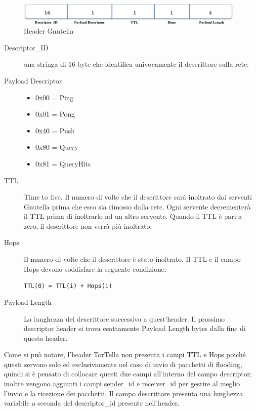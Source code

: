 \begin{figure}[H]
\begin{center}
\includegraphics[scale=0.38]{etc/gnutellaheader.jpg}
\caption{Header Gnutella}
\label{gnutellaheader}
\end{center}
\end{figure}
\begin{description}
\item[Descriptor\_ID] una stringa di 16 byte che identifica univocamente il descrittore sulla rete;
\item[Payload Descriptor]
\begin{itemize}
	\item 0x00 = Ping
	\item 0x01 = Pong
	\item 0x40 = Push
	\item 0x80 = Query
	\item 0x81 = QueryHits	
\end{itemize}
\item[TTL] Time to live. Il numero di volte che il descrittore sarà inoltrato dai serventi Gnutella prima che esso sia rimosso dalla rete. Ogni servente decrementerà il TTL prima di inoltrarlo ad un altro servente. Quando il TTL è pari a zero, il descrittore non verrà più inoltrato;
\item[Hops] Il numero di volte che il descrittore è stato inoltrato. Il TTL e il campo Hops devono soddisfare la seguente condizione: 
\begin{center}
\texttt{TTL(0) = TTL(i)  + Hops(i)}
\end{center}
\item[Payload Length] La lunghezza del descrittore successivo a quest’header. Il prossimo descriptor header si trova esattamente Payload Length bytes dalla fine di questo header.
\end{description}
Come si può notare, l’header TorTella non presenta i campi TTL e Hops poiché questi servono solo ed esclusivamente nel caso di invio di pacchetti di flooding, quindi si è pensato di collocare questi due campi all’interno del campo descriptor; inoltre vengono aggiunti i campi sender\_id e receiver\_id per gestire al meglio l’invio e la ricezione dei pacchetti. Il campo descrittore presenta una lunghezza variabile a seconda del descriptor\_id presente nell’header.